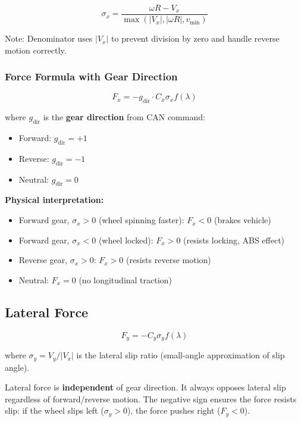 \documentclass[11pt,a4paper]{article}
\begin{document}
\begin{equation}
\sigma_x = \frac{\omega R - V_x}{\max(|V_x|, |\omega R|, v_{\min})}
\end{equation}

Note: Denominator uses $|V_x|$ to prevent division by zero and handle reverse motion correctly.

\subsubsection{Force Formula with Gear Direction}

\begin{equation}
F_x = -g_{\text{dir}} \cdot C_x \sigma_x f(\lambda)
\label{eq:fx_formula}
\end{equation}

where $g_{\text{dir}}$ is the \textbf{gear direction} from CAN command:
\begin{itemize}
    \item Forward: $g_{\text{dir}} = +1$
    \item Reverse: $g_{\text{dir}} = -1$
    \item Neutral: $g_{\text{dir}} = 0$
\end{itemize}

\textbf{Physical interpretation:}
\begin{itemize}
    \item Forward gear, $\sigma_x > 0$ (wheel spinning faster): $F_x < 0$ (brakes vehicle)
    \item Forward gear, $\sigma_x < 0$ (wheel locked): $F_x > 0$ (resists locking, ABS effect)
    \item Reverse gear, $\sigma_x > 0$: $F_x > 0$ (resists reverse motion)
    \item Neutral: $F_x = 0$ (no longitudinal traction)
\end{itemize}

\subsection{Lateral Force}

\begin{equation}
F_y = -C_y \sigma_y f(\lambda)
\end{equation}

where $\sigma_y = V_y / |V_x|$ is the lateral slip ratio (small-angle approximation of slip angle).

Lateral force is \textbf{independent} of gear direction. It always opposes lateral slip regardless of forward/reverse motion. The negative sign ensures the force resists slip: if the wheel slips left ($\sigma_y > 0$), the force pushes right ($F_y < 0$).
\end{document}
